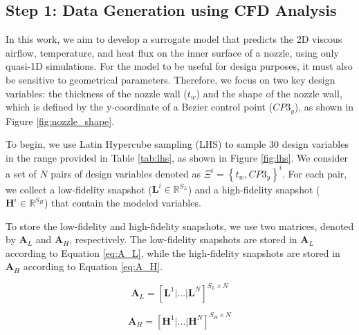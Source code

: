 \documentclass[10pt,oneside,a4paper,twocolumn]{article}
\begin{document}
\subsection{Step 1: Data Generation using CFD Analysis }

In this work, we aim to develop a surrogate model that predicts the 2D viscous airflow, temperature, and heat flux on the inner surface of a nozzle, using only quasi-1D simulations. For the model to be useful for design purposes, it must also be sensitive to geometrical parameters. Therefore, we focus on two key design variables: the thickness of the nozzle wall ($t_w$) and the shape of the nozzle wall, which is defined by the y-coordinate of a Bezier control point ($CP3_y$), as shown in Figure \ref{fig:nozzle_shape}.

To begin, we use Latin Hypercube sampling (LHS) \cite{McKay1979} to sample 30 design variables in the range provided in Table \ref{tab:lhs}, as shown in Figure \ref{fig:lhs}. We consider a set of $N$ pairs of design variables denoted as $\Xi^i=\left\{t_w, CP3_y\right\}^i$. For each pair, we collect a low-fidelity snapshot ($\mathbf{L}^i \in \mathbb{R}^{S_L}$) and a high-fidelity snapshot ($\mathbf{H}^i \in \mathbb{R}^{S_H}$) that contain the modeled variables.

To store the low-fidelity and high-fidelity snapshots, we use two matrices, denoted by $\mathbf{A}_L$ and $\mathbf{A}_H$, respectively. The low-fidelity snapshots are stored in $\mathbf{A}_L$ according to Equation \eqref{eq:A_L}, while the high-fidelity snapshots are stored in $\mathbf{A}_H$ according to Equation \eqref{eq:A_H}. 

\begin{equation}
\mathbf{A}_L = \left[ \mathbf{L}^1 | \dots | \mathbf{L}^N\right]^{S_L \times N}     
\label{eq:A_L}
\end{equation}

\begin{equation}
\mathbf{A}_H = \left[ \mathbf{H}^1 | \dots | \mathbf{H}^N\right]^{S_H \times N}
\label{eq:A_H}
\end{equation}
\end{document}
